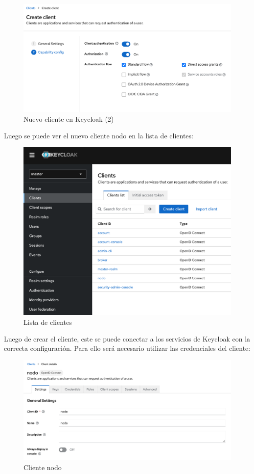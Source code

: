 \begin{figure}[H]
	\centering
	\includegraphics[width=1\linewidth]{Graphics/client_new2}
	\caption{Nuevo cliente en Keycloak (2)}
	\label{fig:clientnew2}
\end{figure}

Luego se puede ver el nuevo cliente nodo en la lista de clientes:

\begin{figure}[H]
	\centering
	\includegraphics[width=0.9\linewidth]{Graphics/client_list}
	\caption{Lista de clientes}
	\label{fig:clientlist}
\end{figure}

Luego de crear el cliente, este se puede conectar a los servicios de Keycloak con la correcta configuración. Para ello será necesario utilizar las credenciales del cliente:

\begin{figure}[H]
	\centering
	\includegraphics[width=0.9\linewidth]{Graphics/client_nodo}
	\caption{Cliente nodo}
	\label{fig:clientnodo}
\end{figure}


